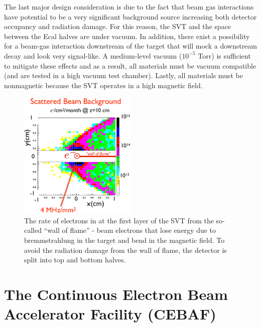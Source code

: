 The last major design consideration is due to the fact that beam gas interactions have potential to be a very significant background source increasing both detector occupancy and radiation damage. For this reason, the SVT and the space between the Ecal halves are under vacuum. In addition, there exist a possibility for a beam-gas interaction downstream of the target that will mock a downstream decay and look very signal-like. A medium-level vacuum ($10^{-5}$ Torr) is sufficient to mitigate these effects and as a result, all materials must be vacuum compatible (and are tested in a high vacuum test chamber). Lastly, all materials must be nonmagnetic because the SVT operates in a high magnetic field.


\begin{figure}
    \centering
    \includegraphics[width=0.5\textwidth]{figs/detector/beam_bg.png}
    \caption{The rate of electrons in at the first layer of the SVT from the so-called ``wall of flame'' - beam electrons that lose energy due to bremmstrahlung in the target and bend in the magnetic field. To avoid the radiation damage from the wall of flame, the detector is split into top and bottom halves.}
    \label{fig:beambg}
\end{figure}

\section{The Continuous Electron Beam Accelerator Facility (CEBAF)}\label{sec:cebaf}

